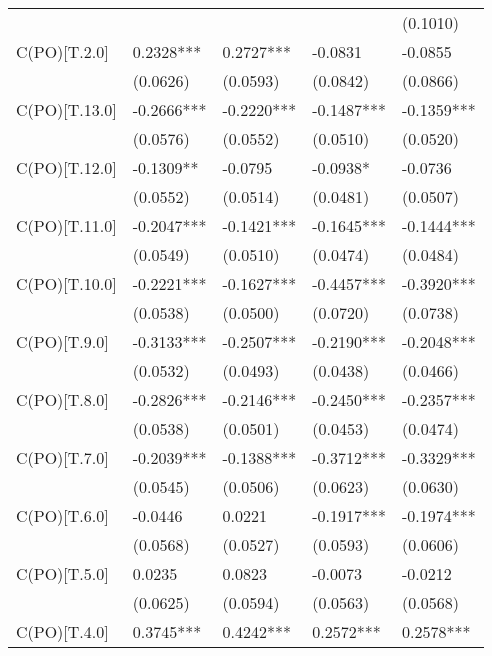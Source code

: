 \begin{table}
\begin{center}
\begin{tabular}{lllll}
                         &            &            &            & (0.1010)    \\
C(PO)[T.2.0]             & 0.2328***  & 0.2727***  & -0.0831    & -0.0855     \\
                         & (0.0626)   & (0.0593)   & (0.0842)   & (0.0866)    \\
C(PO)[T.13.0]            & -0.2666*** & -0.2220*** & -0.1487*** & -0.1359***  \\
                         & (0.0576)   & (0.0552)   & (0.0510)   & (0.0520)    \\
C(PO)[T.12.0]            & -0.1309**  & -0.0795    & -0.0938*   & -0.0736     \\
                         & (0.0552)   & (0.0514)   & (0.0481)   & (0.0507)    \\
C(PO)[T.11.0]            & -0.2047*** & -0.1421*** & -0.1645*** & -0.1444***  \\
                         & (0.0549)   & (0.0510)   & (0.0474)   & (0.0484)    \\
C(PO)[T.10.0]            & -0.2221*** & -0.1627*** & -0.4457*** & -0.3920***  \\
                         & (0.0538)   & (0.0500)   & (0.0720)   & (0.0738)    \\
C(PO)[T.9.0]             & -0.3133*** & -0.2507*** & -0.2190*** & -0.2048***  \\
                         & (0.0532)   & (0.0493)   & (0.0438)   & (0.0466)    \\
C(PO)[T.8.0]             & -0.2826*** & -0.2146*** & -0.2450*** & -0.2357***  \\
                         & (0.0538)   & (0.0501)   & (0.0453)   & (0.0474)    \\
C(PO)[T.7.0]             & -0.2039*** & -0.1388*** & -0.3712*** & -0.3329***  \\
                         & (0.0545)   & (0.0506)   & (0.0623)   & (0.0630)    \\
C(PO)[T.6.0]             & -0.0446    & 0.0221     & -0.1917*** & -0.1974***  \\
                         & (0.0568)   & (0.0527)   & (0.0593)   & (0.0606)    \\
C(PO)[T.5.0]             & 0.0235     & 0.0823     & -0.0073    & -0.0212     \\
                         & (0.0625)   & (0.0594)   & (0.0563)   & (0.0568)    \\
C(PO)[T.4.0]             & 0.3745***  & 0.4242***  & 0.2572***  & 0.2578***   \\

\end{tabular}
\end{center}
\end{table}
